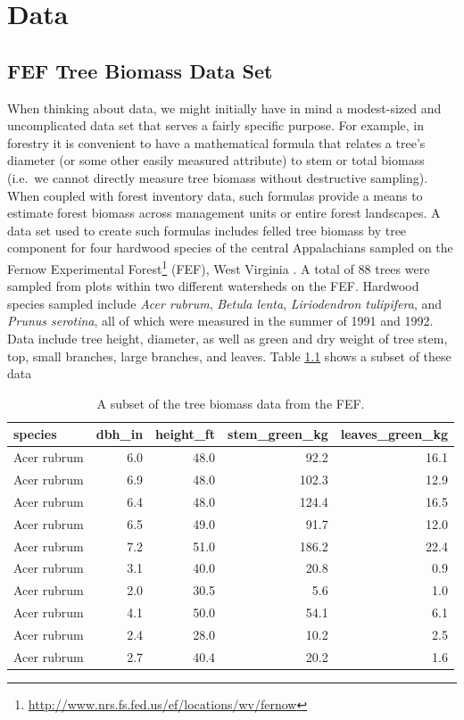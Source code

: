 \documentclass[]{krantz}
\renewcommand{\href}[2]{#2\footnote{\url{#1}}}
\begin{document}
\hypertarget{data}{%
\chapter{Data}\label{data}}

\hypertarget{fef}{%
\section{FEF Tree Biomass Data Set}\label{fef}}

When thinking about data, we might initially have in mind a modest-sized and uncomplicated data set that serves a fairly specific purpose. For example, in forestry it is convenient to have a mathematical formula that relates a tree's diameter (or some other easily measured attribute) to stem or total biomass (i.e.~we cannot directly measure tree biomass without destructive sampling). When coupled with forest inventory data, such formulas provide a means to estimate forest biomass across management units or entire forest landscapes. A data set used to create such formulas includes felled tree biomass by tree component for four hardwood species of the central Appalachians sampled on the \href{http://www.nrs.fs.fed.us/ef/locations/wv/fernow}{Fernow Experimental Forest} (FEF), West Virginia \citet{Wood2016}. A total of 88 trees were sampled from plots within two different watersheds on the FEF. Hardwood species sampled include \emph{Acer rubrum}, \emph{Betula lenta}, \emph{Liriodendron tulipifera}, and \emph{Prunus serotina}, all of which were measured in the summer of 1991 and 1992. Data include tree height, diameter, as well as green and dry weight of tree stem, top, small branches, large branches, and leaves. Table \ref{tab:sppbio} shows a subset of these data

\begin{table}[t]

\caption{\label{tab:sppbio}A subset of the tree biomass data from the FEF.}
\centering
\begin{tabular}{lrrrr}
\toprule
species & dbh\_in & height\_ft & stem\_green\_kg & leaves\_green\_kg\\
\midrule
Acer rubrum & 6.0 & 48.0 & 92.2 & 16.1\\
Acer rubrum & 6.9 & 48.0 & 102.3 & 12.9\\
Acer rubrum & 6.4 & 48.0 & 124.4 & 16.5\\
Acer rubrum & 6.5 & 49.0 & 91.7 & 12.0\\
Acer rubrum & 7.2 & 51.0 & 186.2 & 22.4\\
\addlinespace
Acer rubrum & 3.1 & 40.0 & 20.8 & 0.9\\
Acer rubrum & 2.0 & 30.5 & 5.6 & 1.0\\
Acer rubrum & 4.1 & 50.0 & 54.1 & 6.1\\
Acer rubrum & 2.4 & 28.0 & 10.2 & 2.5\\
Acer rubrum & 2.7 & 40.4 & 20.2 & 1.6\\
\bottomrule
\end{tabular}
\end{table}
\end{document}

